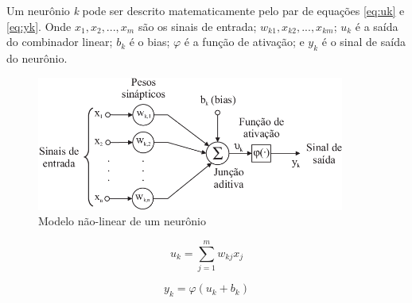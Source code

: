     Um neurônio \textit{k} pode ser descrito matematicamente pelo par de equações \ref{eq:uk} e \ref{eq:yk}. Onde ${x_{1}, x_{2}, ..., x_{m}}$ são os sinais de entrada; ${w_{k1}, x_{k2}, ..., x_{km}}$; ${u_{k}}$ é a saída do combinador linear; ${b_{k}}$ é o bias; $\varphi$ é a função de ativação; e ${y_{k}}$ é o sinal de saída do neurônio.
    
    \begin{figure}
    \centering
    \includegraphics[width=0.9\textwidth]{modelo-monografia-rej-2018/img/Figura-1-Modelo-nao-linear-de-um-neuronio-Haykin-2001.png}
    \caption{Modelo não-linear de um neurônio}
    \label{fig:MoudeloNeuroNL}
    \end{figure}
    
    
    \begin{equation} \label{eq:uk}
        u_{k} = \sum_{j=1}^{m}{w_{kj}x_{j}}     
    \end{equation}
    
    \begin{equation} \label{eq:yk}
        y_{k} = \varphi (u_{k}+b_{k})
    \end{equation}
    
